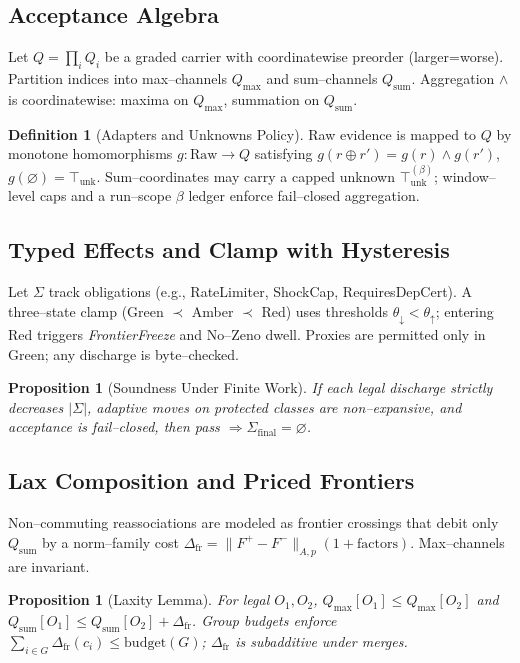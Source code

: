 \documentclass[11pt]{article}
\theoremstyle{plain}
\newtheorem{proposition}[theorem]{Proposition}
\theoremstyle{definition}
\newtheorem{definition}[theorem]{Definition}
\theoremstyle{remark}
\newcommand{\Qsum}{\ensuremath{Q_{\mathrm{sum}}}}
\newcommand{\Qmax}{\ensuremath{Q_{\mathrm{max}}}}
\begin{document}
\subsection{Acceptance Algebra}
Let $Q=\prod_i Q_i$ be a graded carrier with coordinatewise preorder (larger=worse). Partition indices into max--channels $\Qmax$ and sum--channels $\Qsum$. Aggregation $\wedge$ is coordinatewise: maxima on $\Qmax$, summation on $\Qsum$.

\begin{definition}[Adapters and Unknowns Policy]
Raw evidence is mapped to $Q$ by monotone homomorphisms $g:\mathrm{Raw}\to Q$ satisfying $g(r\oplus r')=g(r)\wedge g(r')$, $g(\varnothing)=\top_{\mathrm{unk}}$. Sum--coordinates may carry a capped unknown $\top^{(\beta)}_{\mathrm{unk}}$; window--level caps and a run--scope $\beta$ ledger enforce fail--closed aggregation.
\end{definition}

\subsection{Typed Effects and Clamp with Hysteresis}
Let $\Sigma$ track obligations (e.g., RateLimiter, ShockCap, RequiresDepCert). A three--state clamp (Green $\prec$ Amber $\prec$ Red) uses thresholds $\theta_\downarrow<\theta_\uparrow$; entering Red triggers \emph{FrontierFreeze} and No--Zeno dwell. Proxies are permitted only in Green; any discharge is byte--checked.

\begin{proposition}[Soundness Under Finite Work]
If each legal discharge strictly decreases $|\Sigma|$, adaptive moves on protected classes are non--expansive, and acceptance is fail--closed, then pass $\Rightarrow \Sigma_{\mathrm{final}}=\varnothing$.
\end{proposition}

\subsection{Lax Composition and Priced Frontiers}
Non--commuting reassociations are modeled as frontier crossings that debit only $\Qsum$ by a norm--family cost $\Delta_{\mathrm{fr}}=\|\!F^+-F^-\!\|_{A,p}(1+\mathrm{factors})$. Max--channels are invariant.
\begin{proposition}[Laxity Lemma]
For legal $O_1,O_2$, $\Qmax[O_1]\le \Qmax[O_2]$ and $\Qsum[O_1]\le \Qsum[O_2]+\Delta_{\mathrm{fr}}$. Group budgets enforce $\sum_{i\in G}\Delta_{\mathrm{fr}}(c_i)\le \mathrm{budget}(G)$; $\Delta_{\mathrm{fr}}$ is subadditive under merges.
\end{proposition}
\end{document}
